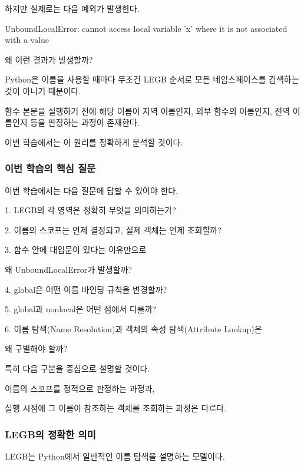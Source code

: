 하지만 실제로는 다음 예외가 발생한다.

\begin{dhkzsh}
UnboundLocalError: cannot access local variable 'x' 
where it is not associated with a value
\end{dhkzsh}

왜 이런 결과가 발생할까?

Python은 이름을 사용할 때마다 무조건 LEGB 순서로 모든 네임스페이스를 검색하는 것이 아니기 때문이다.

함수 본문을 실행하기 전에 해당 이름이 지역 이름인지, 외부 함수의 이름인지, 전역 이름인지 등을 판정하는 과정이 존재한다.

이번 학습에서는 이 원리를 정확하게 분석할 것이다.

\subsubsection{이번 학습의 핵심 질문}

이번 학습에서는 다음 질문에 답할 수 있어야 한다.

\begin{dhksmry}
    1. LEGB의 각 영역은 정확히 무엇을 의미하는가?

    2. 이름의 스코프는 언제 결정되고, 실제 객체는 언제 조회할까?

    3. 함수 안에 대입문이 있다는 이유만으로 
    
       왜 UnboundLocalError가 발생할까?

    4. global은 어떤 이름 바인딩 규칙을 변경할까?

    5. global과 nonlocal은 어떤 점에서 다를까?

    6. 이름 탐색(Name Resolution)과 객체의 속성 탐색(Attribute Lookup)은

       왜 구별해야 할까?
\end{dhksmry}

특히 다음 구분을 중심으로 설명할 것이다.

\begin{dhksmry}[centered]
이름의 스코프를 정적으로 판정하는 과정과,

실행 시점에 그 이름이 참조하는 객체를 조회하는 과정은 다르다.
\end{dhksmry}

\subsubsection{LEGB의 정확한 의미}

LEGB는 Python에서 일반적인 이름 탐색을 설명하는 모델이다.

